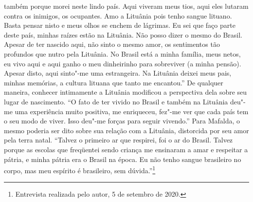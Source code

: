 também porque morei neste lindo país. Aqui viveram meus tios, aqui eles
lutaram contra os inimigos, os ocupantes. Amo a Lituânia pois tenho
sangue lituano. Basta pensar nisto e meus olhos se enchem de lágrimas.
Eu sei que faço parte deste país, minhas raízes estão na Lituânia. Não
posso dizer o mesmo do Brasil. Apesar de ter nascido aqui, não sinto o
mesmo amor, os sentimentos tão profundos que nutro pela Lituânia. No
Brasil está a minha família, meus netos, eu vivo aqui e aqui ganho o meu
dinheirinho para sobreviver (a minha pensão). Apesar disto, aqui
sinto"-me uma estrangeira. Na Lituânia deixei meus pais, minhas memórias,
a cultura lituana que tanto me encantou.'' De qualquer maneira, conhecer
intimamente a Lituânia modificou a perspectiva dela sobre seu lugar de
nascimento. ``O fato de ter vivido no Brasil e também na Lituânia deu"-me
uma experiência muito positiva, me enriqueceu, fez"-me ver que cada país
tem o seu modo de viver. Isso deu"-me forças para seguir vivendo.'' Para
Mafalda, o mesmo poderia ser dito sobre sua relação com a Lituânia,
distorcida por seu amor pela terra natal. ``Talvez o primeiro ar que
respirei, foi o ar do Brasil. Talvez porque as escolas que freqüentei
sendo criança me ensinaram a amar e respeitar a pátria, e minha pátria
era o Brasil na época. Eu não tenho sangue brasileiro no corpo, mas meu
espírito é brasileiro, sem dúvida.''\footnote{Entrevista realizada pelo
  autor, 5 de setembro de 2020.}


